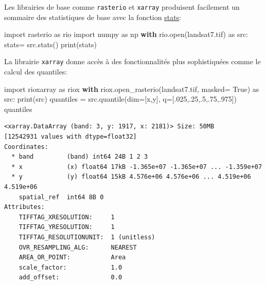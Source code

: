 \documentclass[
  french,
  11pt,
  letterpaper,
  open=any,
  twoside=false,
  french]{scrbook}
\newenvironment{Shaded}{\begin{snugshade}}{\end{snugshade}}
\newcommand{\BuiltInTok}[1]{\textcolor[rgb]{0.00,0.23,0.31}{#1}}
\newcommand{\ControlFlowTok}[1]{\textcolor[rgb]{0.00,0.23,0.31}{\textbf{#1}}}
\newcommand{\FloatTok}[1]{\textcolor[rgb]{0.68,0.00,0.00}{#1}}
\newcommand{\ImportTok}[1]{\textcolor[rgb]{0.00,0.46,0.62}{#1}}
\newcommand{\NormalTok}[1]{\textcolor[rgb]{0.00,0.23,0.31}{#1}}
\newcommand{\OperatorTok}[1]{\textcolor[rgb]{0.37,0.37,0.37}{#1}}
\newcommand{\StringTok}[1]{\textcolor[rgb]{0.13,0.47,0.30}{#1}}
\newcommand{\VariableTok}[1]{\textcolor[rgb]{0.07,0.07,0.07}{#1}}
\begin{document}
Les librairies de base comme \texttt{rasterio} et \texttt{xarray}
produisent facilement un sommaire des statistiques de base avec la
fonction
\href{https://rasterio.readthedocs.io/en/stable/api/rasterio.io.html\#rasterio.io.BufferedDatasetWriter.stats}{stats}:

\begin{Shaded}
\begin{Highlighting}[]
\ImportTok{import}\NormalTok{ rasterio }\ImportTok{as}\NormalTok{ rio}
\ImportTok{import}\NormalTok{ numpy }\ImportTok{as}\NormalTok{ np}
\ControlFlowTok{with}\NormalTok{ rio.}\BuiltInTok{open}\NormalTok{(}\StringTok{\textquotesingle{}landsat7.tif\textquotesingle{}}\NormalTok{) }\ImportTok{as}\NormalTok{ src:}
\NormalTok{    stats}\OperatorTok{=}\NormalTok{ src.stats()}
    \BuiltInTok{print}\NormalTok{(stats)}
\end{Highlighting}
\end{Shaded}

La librairie \texttt{xarray} donne accès à des fonctionnalités plus
sophistiquées comme le calcul des quantiles:

\begin{Shaded}
\begin{Highlighting}[]
\ImportTok{import}\NormalTok{ rioxarray }\ImportTok{as}\NormalTok{ riox}
\ControlFlowTok{with}\NormalTok{ riox.open\_rasterio(}\StringTok{\textquotesingle{}landsat7.tif\textquotesingle{}}\NormalTok{, masked}\OperatorTok{=} \VariableTok{True}\NormalTok{) }\ImportTok{as}\NormalTok{ src:}
    \BuiltInTok{print}\NormalTok{(src)}
\NormalTok{quantiles }\OperatorTok{=}\NormalTok{ src.quantile(dim}\OperatorTok{=}\NormalTok{[}\StringTok{\textquotesingle{}x\textquotesingle{}}\NormalTok{,}\StringTok{\textquotesingle{}y\textquotesingle{}}\NormalTok{], q}\OperatorTok{=}\NormalTok{[}\FloatTok{.025}\NormalTok{,}\FloatTok{.25}\NormalTok{,}\FloatTok{.5}\NormalTok{,}\FloatTok{.75}\NormalTok{,}\FloatTok{.975}\NormalTok{])}
\NormalTok{quantiles}
\end{Highlighting}
\end{Shaded}

\begin{verbatim}
<xarray.DataArray (band: 3, y: 1917, x: 2181)> Size: 50MB
[12542931 values with dtype=float32]
Coordinates:
  * band         (band) int64 24B 1 2 3
  * x            (x) float64 17kB -1.365e+07 -1.365e+07 ... -1.359e+07
  * y            (y) float64 15kB 4.576e+06 4.576e+06 ... 4.519e+06 4.519e+06
    spatial_ref  int64 8B 0
Attributes:
    TIFFTAG_XRESOLUTION:     1
    TIFFTAG_YRESOLUTION:     1
    TIFFTAG_RESOLUTIONUNIT:  1 (unitless)
    OVR_RESAMPLING_ALG:      NEAREST
    AREA_OR_POINT:           Area
    scale_factor:            1.0
    add_offset:              0.0
\end{verbatim}
\end{document}
